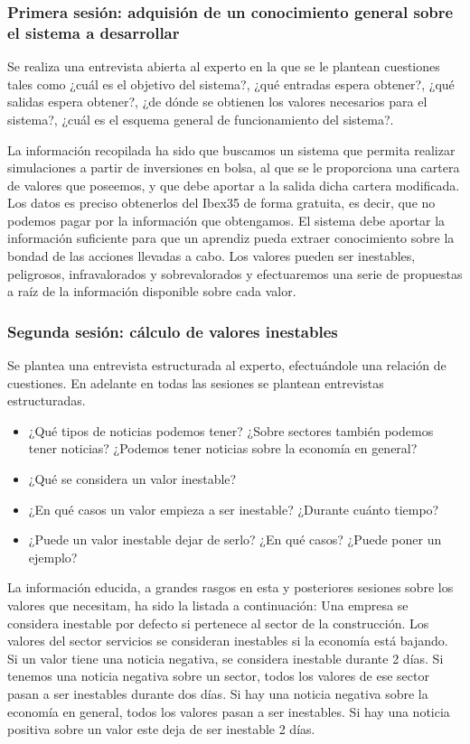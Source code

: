 \documentclass[a4paper,11pt]{article}
\begin{document}
\subsubsection{Primera sesión: adquisión de un conocimiento general sobre el sistema a desarrollar}

Se realiza una entrevista abierta al experto en la que se le plantean cuestiones tales como ¿cuál es el objetivo del sistema?,
¿qué entradas espera obtener?, ¿qué salidas espera obtener?, ¿de dónde se obtienen los valores necesarios para el sistema?,
¿cuál es el esquema general de funcionamiento del sistema?.

La información recopilada ha sido que buscamos un sistema que permita realizar simulaciones a partir de inversiones en bolsa,
al que se le proporciona una cartera de valores que poseemos, y que debe aportar a la salida dicha cartera modificada. 
Los datos es preciso obtenerlos del Ibex35 de forma gratuita, es decir, que no podemos pagar por la información que obtengamos.
El sistema debe aportar la información suficiente para que un aprendiz pueda extraer conocimiento sobre la bondad de las acciones
llevadas a cabo. Los valores pueden ser inestables, peligrosos, infravalorados y sobrevalorados y efectuaremos
una serie de propuestas a raíz de la información disponible sobre cada valor.

\subsubsection{Segunda sesión: cálculo de valores inestables}

Se plantea una entrevista estructurada al experto, efectuándole una relación de cuestiones. En adelante en todas las sesiones
se plantean entrevistas estructuradas.

\begin{itemize}
 \item ¿Qué tipos de noticias podemos tener? ¿Sobre sectores también podemos tener noticias?
  ¿Podemos tener noticias sobre la economía en general?
 \item ¿Qué se considera un valor inestable?
 \item ¿En qué casos un valor empieza a ser inestable? ¿Durante cuánto tiempo?
 \item ¿Puede un valor inestable dejar de serlo? ¿En qué casos? ¿Puede poner un ejemplo?
\end{itemize}

La información educida, a grandes rasgos en esta y posteriores sesiones sobre los valores que necesitam, ha sido la listada a continuación: 
Una empresa se considera inestable por defecto si pertenece al sector de la construcción. Los valores del sector servicios
se consideran inestables si la economía está bajando. Si un valor tiene una noticia negativa, se considera inestable durante 2 días.
Si tenemos una noticia negativa sobre un sector, todos los valores de ese sector pasan a ser inestables durante dos días.
Si hay una noticia negativa sobre la economía en general, todos los valores pasan a ser inestables.
Si hay una noticia positiva sobre un valor este deja de ser inestable 2 días.
\end{document}
